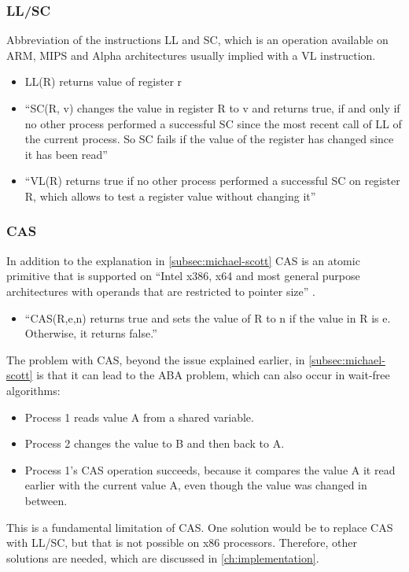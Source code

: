\subsubsection{\acf{LL/SC}}\label{subsubsec:llsc}
Abbreviation of the instructions \ac{LL} and \ac{SC}, which is an operation available on ARM, MIPS and Alpha architectures usually implied with a \ac{VL} instruction.
\begin{itemize}
    \item \ac{LL}(R) returns value of register r
    \item \enquote{\ac{SC}(R, v) changes the value in register R to v and returns true, if and only if no other process performed a successful SC since the most recent call of LL of the current process. So SC fails if the value of the register has changed since it has been read} \cite{Fuchs2014EvaluationOT}
    \item \enquote{\ac{VL}(R) returns true if no other process performed a successful SC on register R, which allows to test a register value without changing it} \cite{Fuchs2014EvaluationOT}
\end{itemize}
\cite{Fuchs2014EvaluationOT}

\subsubsection{\acf{CAS}}\label{subsubsec:compare-and-swap}
In addition to the explanation in \cref{subsec:michael-scott} \ac{CAS} is an atomic primitive that is supported on \enquote{Intel x386, x64 and most general purpose architectures with operands that are restricted to pointer size} \cite{Fuchs2014EvaluationOT}.
\begin{itemize}
    \item \enquote{\ac{CAS}(R,e,n) returns true and sets the value of R to n if the value in R is e. Otherwise, it returns false.} \cite{Fuchs2014EvaluationOT}
\end{itemize}
The problem with \ac{CAS}, beyond the issue explained earlier, in \cref{subsec:michael-scott} is that it can lead to the ABA problem, which can also occur in wait-free algorithms:
\begin{itemize}
    \item Process 1 reads value A from a shared variable.
    \item Process 2 changes the value to B and then back to A.
    \item Process 1's \ac{CAS} operation succeeds, because it compares the value A it read earlier with the current value A, even though the value was changed in between.
\end{itemize}
This is a fundamental limitation of \ac{CAS}. One solution would be to replace \ac{CAS} with \ac{LL/SC}, but that is not possible on x86 processors. Therefore, other solutions are needed, which are discussed in \cref{ch:implementation}. \cite{Fuchs2014EvaluationOT}

